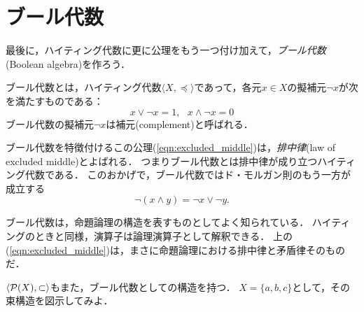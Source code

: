 \documentclass[11pt,a4paper]{jsarticle}
\begin{document}
\section{ブール代数}
最後に，ハイティング代数に更に公理をもう一つ付け加えて，\emph{ブール代数}(Boolean algebra)を作ろう．

\begin{dfn}[ブール代数]
 ブール代数とは，ハイティング代数$\langle X, \preceq \rangle$であって，各元$x \in X$の擬補元$\neg x$が次を満たすものである：
\begin{equation}
 x \vee \neg x = 1, \ \ \ x \wedge \neg x = 0
\label{eqn:excluded_middle}
\end{equation}
ブール代数の擬補元$\neg x$は補元(complement)と呼ばれる．
\end{dfn}
ブール代数を特徴付けるこの公理(\ref{eqn:excluded_middle})は，\emph{排中律}(law of excluded middle)とよばれる．
つまりブール代数とは排中律が成り立つハイティング代数である．
このおかげで，ブール代数ではド・モルガン則のもう一方が成立する
\begin{equation}
 \neg (x \wedge y) = \neg x \vee \neg y.
\end{equation}
 
ブール代数は，命題論理の構造を表すものとしてよく知られている．
ハイティングのときと同様，演算子は論理演算子として解釈できる．
上の(\ref{eqn:excluded_middle})は，まさに命題論理における排中律と矛盾律そのものだ．


\begin{exercise}
 $\langle \mathcal{P}(X), \subset \rangle$もまた，ブール代数としての構造を持つ．
 $X = \{a,b,c\}$として，その束構造を図示してみよ．
\end{exercise}
\end{document}
